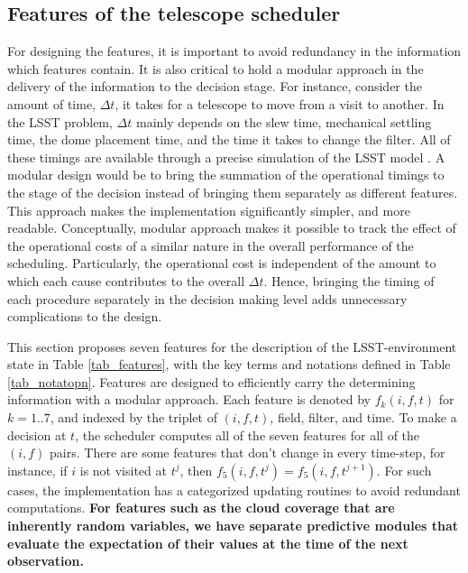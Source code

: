 \documentclass[12pt]{aastex62}
\theoremstyle{definition}
\begin{document}
\subsection{Features of the telescope scheduler}\label{sec_lsst_features}
For designing the features, it is important to avoid redundancy in the information which features contain. It is also critical to hold a modular approach in the delivery of the information to the decision stage. For instance, consider the amount of time, $\Delta t$, it takes for a telescope to move from a visit to another. In the LSST problem, $\Delta t$ mainly depends on the slew time, mechanical settling time, the dome placement time, and the time it takes to change the filter. All of these timings are available through a precise simulation of the LSST model \citep{delgado2014lsst}. A modular design would be to bring the summation of the operational timings to the stage of the decision instead of bringing them separately as different features. This approach makes the implementation significantly simpler, and more readable. Conceptually, modular approach makes it possible to track the effect of the operational costs of a similar nature in the overall performance of the scheduling. Particularly, the operational cost is independent of the amount to which each cause contributes to the overall $\Delta t$. Hence, bringing the timing of each procedure separately in the decision making level adds unnecessary complications to the design.

This section proposes seven features for the description of the LSST-environment state in Table \ref{tab_features}, with the key terms and notations defined in Table \ref{tab_notatopn}. Features are designed to efficiently carry the determining information with a modular approach. Each feature is denoted by $f_k(i,f,t)$ for $k= 1..7$, and indexed by the triplet of $(i,f,t)$, field, filter, and time. To make a decision at $t$, the scheduler computes all of the seven features for all of the $(i,f)$ pairs. There are some features that don't change in every time-step, for instance, if $i$ is not visited at $t^j$, then $f_5(i,f,t^j)= f_5(i,f,t^{j+1})$. For such cases, the implementation has a categorized updating routines to avoid redundant computations. {\bf For features such as the cloud coverage that are inherently random variables, we have separate predictive modules that evaluate the expectation of their values at the time of the next observation. \bf}
\end{document}
